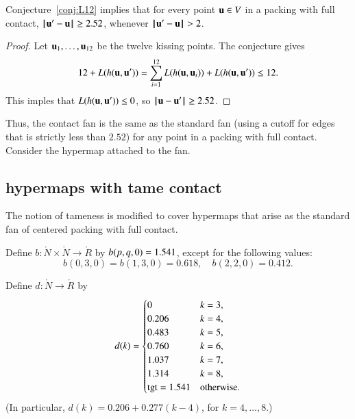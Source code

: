 \begin{lemma}  Conjecture~\ref{conj:L12} implies that for every point $ {\mathbf u}\in V$ in a packing with full contact, ${\hskip0.1em|\hskip-0.15em|\hskip0.1em} {\mathbf u}' -  {\mathbf u}{\hskip0.1em|\hskip-0.15em|\hskip0.1em}\ge 2.52$, whenever ${\hskip0.1em|\hskip-0.15em|\hskip0.1em} {\mathbf u}' -  {\mathbf u}{\hskip0.1em|\hskip-0.15em|\hskip0.1em}> 2$.
\end{lemma}
%
%

\begin{proof} Let $ {\mathbf u}_1,\ldots, {\mathbf u}_{12}$ be the twelve kissing points.  The conjecture gives
$$
12 + L(h( {\mathbf u}, {\mathbf u}')) = \sum_{i=1}^{12} L(h( {\mathbf u}, {\mathbf u}_i)) + L(h( {\mathbf u}, {\mathbf u}')) \le 12.
$$
This imples that $L(h( {\mathbf u}, {\mathbf u}'))\le 0$, so ${\hskip0.1em|\hskip-0.15em|\hskip0.1em} {\mathbf u} -  {\mathbf u}'{\hskip0.1em|\hskip-0.15em|\hskip0.1em}\ge 2.52$.
\end{proof}

Thus, the contact fan is the same as the standard fan (using a cutoff for edges that is strictly less than $2.52$) for any point in a packing with full contact.  Consider the hypermap attached to the fan.
%
%


\subsection{hypermaps with tame contact}

The notion of tameness is modified to cover hypermaps that arise as the standard fan of centered packing with full contact.  
%
%

\begin{definition}[b]
Define $b:\ring{N}\times \ring{N}\to \ring{R}$ by $b(p,q,0)=1.541$,   except for the following values:
$$
b(0,3,0)=b(1,3,0)=0.618,\quad b(2,2,0)=0.412.
$$
\end{definition}
%

\begin{definition}[d]
    Define $d:\ring{N}\to \ring{R}$ by
  $$d(k) = \begin{cases}
    0 & k=3, \\
    0.206 & k=4, \\
    0.483 & k=5, \\
    0.760 & k=6, \\
    1.037 & k=7, \\
    1.314 & k=8,\\
    {\operatorname{tgt}}=1.541 & \text{otherwise}.
  \end{cases}
  $$
(In particular, $d(k) = 0.206 + 0.277 (k-4)$, for $k=4,\ldots,8$.)
\end{definition}
%


